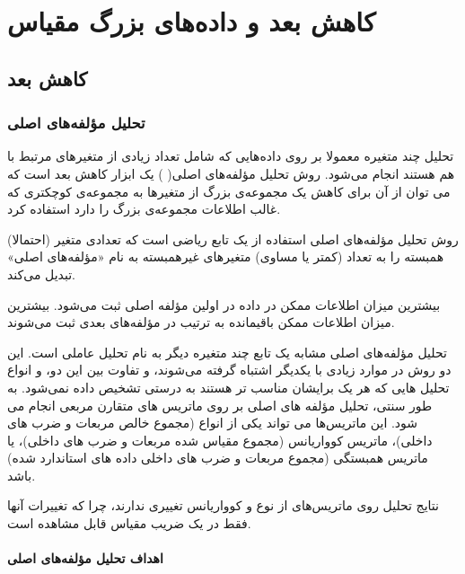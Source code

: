\chapter{
کاهش بعد و داده‌های بزرگ مقیاس
}


\section{
کاهش بعد
}
\subsection{
تحلیل مؤلفه‌های اصلی
}
\label{sec:ch2pca}

تحلیل چند متغیره معمولا بر روی داده‌هایی که شامل تعداد زیادی از متغیرهای مرتبط با هم هستند انجام می‌شود.
روش تحلیل مؤلفه‌های اصلی(
)%
 یک ابزار کاهش بعد است که می توان از آن برای کاهش یک مجموعه‌ی بزرگ از متغیرها به مجموعه‌ی کوچکتری که غالب اطلاعات مجموعه‌ی بزرگ را دارد استفاده کرد.

روش تحلیل مؤلفه‌های اصلی استفاده از یک تابع ریاضی است که تعدادی متغیر (احتمالا) همبسته را به تعداد (کمتر یا مساوی) متغیرهای غیرهمبسته به نام «مؤلفه‌های اصلی» تبدیل می‌کند.

بیشترین میزان اطلاعات ممکن در داده در اولین مؤلفه اصلی ثبت می‌شود. بیشترین میزان اطلاعات ممکن باقیمانده به ترتیب در مؤلفه‌های بعدی ثبت می‌شوند.

تحلیل مؤلفه‌های اصلی مشابه یک تابع چند متغیره دیگر به نام تحلیل عاملی است. این دو روش در موارد زیادی با یکدیگر اشتباه گرفته می‌شوند، و تفاوت بین این دو، و انواع تحلیل هایی که هر یک برایشان مناسب تر هستند به درستی تشخیص داده نمی‌شود.
به طور سنتی، تحلیل مؤلفه های اصلی بر روی ماتریس های متقارن مربعی انجام می شود. این ماتریس‌ها می تواند یکی از انواع
%
 (مجموع خالص مربعات و ضرب های داخلی)، ماتریس کوواریانس%
 (مجموع مقیاس شده مربعات و ضرب های داخلی)، یا ماتریس همبستگی%
 (مجموع مربعات و ضرب های داخلی داده های استاندارد شده) باشد.

نتایج تحلیل روی ماتریس‌های از نوع
 و کوواریانس تغییری ندارند، چرا که تغییرات آنها فقط در یک ضریب مقیاس قابل مشاهده است.


\subsubsection{
اهداف تحلیل مؤلفه‌های اصلی   
}

